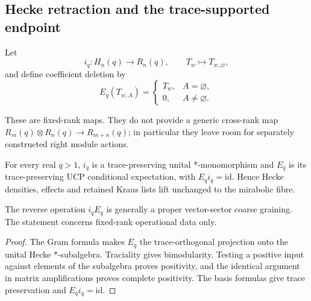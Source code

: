 \subsection{Hecke retraction and the trace-supported endpoint}

\begin{definition}
Let
\[
 i_q:H_n(q)\longrightarrow R_n(q),\qquad T_w\longmapsto T_{w,\varnothing},
\]
and define coefficient deletion by
\[
 E_q(T_{w,A})=
 \begin{cases}T_w,&A=\varnothing,\\0,&A\neq\varnothing.
 \end{cases}
\]
\end{definition}
\begin{scope}
These are fixed-rank maps.  They do not provide a generic cross-rank map
$R_m(q)\otimes R_n(q)\to R_{m+n}(q)$; in particular they leave room for
separately constructed right module actions.
\end{scope}

\begin{theorem}
{\normalfont\statusProved}\quad
For every real $q>1$, $i_q$ is a trace-preserving unital *-monomorphism and
$E_q$ is its trace-preserving UCP conditional expectation, with
$E_qi_q=\mathrm{id}$.  Hence Hecke densities, effects and retained Kraus
lists lift unchanged to the mirabolic fibre.
\end{theorem}
\begin{scope}
The reverse operation $i_qE_q$ is generally a proper vector-sector coarse
graining.  The statement concerns fixed-rank operational data only.
\end{scope}
\begin{proof}
The Gram formula makes $E_q$ the trace-orthogonal projection onto the unital
Hecke *-subalgebra.  Traciality gives bimodularity.  Testing a positive input
against elements of the subalgebra proves positivity, and the identical
argument in matrix amplifications proves complete positivity.  The basis
formulas give trace preservation and $E_qi_q=\mathrm{id}$.
\end{proof}

